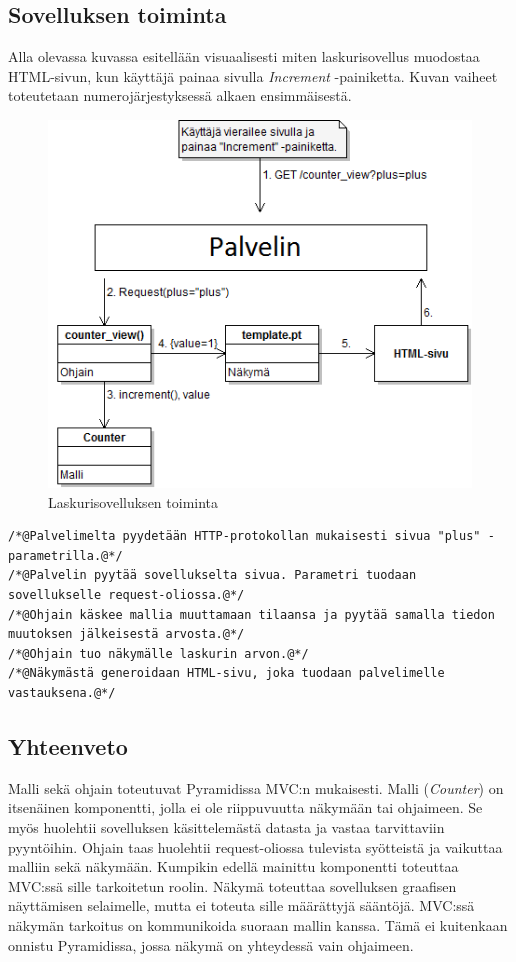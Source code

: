 \documentclass[finnish,utf8,nonumbib,palatino,kandi]{gradu2}
\begin{document}
\subsection{Sovelluksen toiminta}
Alla olevassa kuvassa esitellään visuaalisesti miten laskurisovellus muodostaa HTML-sivun, kun käyttäjä painaa sivulla \emph{Increment} -painiketta. Kuvan
vaiheet toteutetaan numerojärjestyksessä alkaen ensimmäisestä.
\begin{figure}[h]
\centering
\includegraphics[scale=0.87]{laskurisovellus.png}
\caption{Laskurisovelluksen toiminta}
\end{figure}
\newpage
{}

\begin{lstlisting}
/*@Palvelimelta pyydetään HTTP-protokollan mukaisesti sivua "plus" -parametrilla.@*/
/*@Palvelin pyytää sovellukselta sivua. Parametri tuodaan sovellukselle request-oliossa.@*/ 
/*@Ohjain käskee mallia muuttamaan tilaansa ja pyytää samalla tiedon muutoksen jälkeisestä arvosta.@*/ 
/*@Ohjain tuo näkymälle laskurin arvon.@*/ 
/*@Näkymästä generoidaan HTML-sivu, joka tuodaan palvelimelle vastauksena.@*/ 
\end{lstlisting}

\subsection{Yhteenveto}
Malli sekä ohjain toteutuvat Pyramidissa MVC:n mukaisesti. Malli (\emph{Counter}) on itsenäinen komponentti, jolla ei ole riippuvuutta näkymään tai ohjaimeen. Se myös huolehtii sovelluksen käsittelemästä datasta ja vastaa tarvittaviin pyyntöihin. Ohjain taas huolehtii request-oliossa tulevista syötteistä ja vaikuttaa malliin sekä näkymään.  Kumpikin edellä mainittu komponentti toteuttaa MVC:ssä sille tarkoitetun roolin. Näkymä toteuttaa sovelluksen graafisen näyttämisen selaimelle, mutta ei toteuta sille määrättyjä sääntöjä. MVC:ssä näkymän tarkoitus on kommunikoida suoraan mallin kanssa. Tämä ei kuitenkaan onnistu Pyramidissa, jossa näkymä on yhteydessä vain ohjaimeen. 
\end{document}
